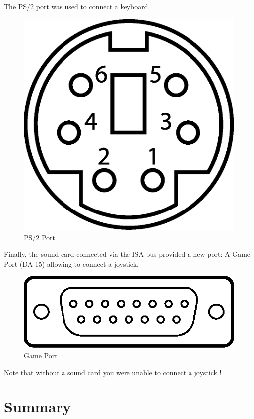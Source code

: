 \documentclass[book.tex]{subfiles}
\begin{document}
The PS/2 port was used to connect a keyboard.
 \begin{figure}[H]
\centering
\includegraphics[scale=0.2]{imgs/ports/MiniDIN-6_PS2.eps}
%
\caption{PS/2 Port}
\label{fig:ps2Port}
\end{figure}


Finally, the sound card connected via the ISA bus provided a new port: A Game Port (DA-15) allowing to connect a joystick.
 \begin{figure}[H]
\centering
\includegraphics[scale=0.9]{imgs/ports/DA-15_GamePort.eps}
%
\caption{Game Port}
\label{fig:gamePort}
\end{figure}

Note that without a sound card you were unable to connect a joystick !



\section{Summary}
\end{document}
